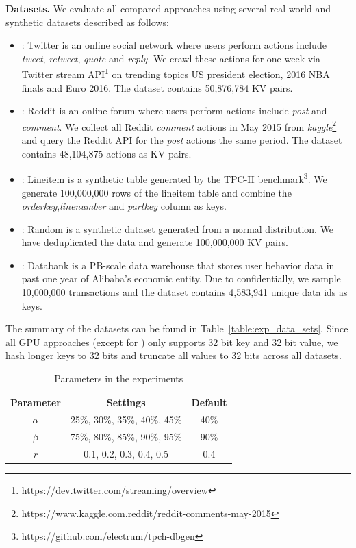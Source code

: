 \vspace{1mm}\noindent\textbf{Datasets.} We evaluate all compared approaches using several real world and synthetic datasets described as follows:
\begin{itemize}
	\item \dstwitter: Twitter is an online social network where users perform actions include \emph{tweet}, \emph{retweet}, \emph{quote} and \emph{reply}.
	We crawl these actions for one week via Twitter stream API\footnote{https://dev.twitter.com/streaming/overview} on trending topics US president election, 2016 NBA finals and Euro 2016. The dataset contains 50,876,784 KV pairs.
	\item \dsreddit: Reddit is an online forum where users perform actions include \emph{post} and \emph{comment}. We collect all Reddit \emph{comment} actions in May 2015 from \emph{kaggle}\footnote{https://www.kaggle.com.reddit/reddit-comments-may-2015} and query the Reddit API for the \emph{post} actions the same period. The dataset contains 48,104,875 actions as KV pairs. 
 	\item \dstpch: Lineitem is a synthetic table generated by the TPC-H benchmark\footnote{https://github.com/electrum/tpch-dbgen}. We generate  100,000,000 rows of the lineitem table and combine the \emph{orderkey},\emph{linenumber} and \emph{partkey} column as keys. 
	\item \dsrandom: Random is a synthetic dataset generated from a normal distribution. We have deduplicated the data and generate 100,000,000 KV pairs.  
	\item \dsali: Databank is a PB-scale data warehouse that stores user behavior data in past one year of Alibaba's economic entity. Due to confidentially, we sample 10,000,000 transactions and the dataset contains 4,583,941 unique data ids as keys.
\end{itemize}
The summary of the datasets can be found in Table~\ref{table:exp_data_sets}.
Since all GPU approaches (except for \voter) only supports 32 bit key and 32 bit value, we hash longer keys to 32 bits and truncate all values to 32 bits across all datasets. 


\begin{table}
	\centering
	\caption{Parameters in the experiments}
	\label{tbl:parameters}
	\begin{tabular}{|c|c|c|}
		\hline
		\textbf{Parameter} & \textbf{Settings} & \textbf{Default} \\ \hline
		$\alpha$ & 25\%, 30\%, 35\%, 40\%, 45\% & 40\% \\ \hline
		$\beta$  & 75\%, 80\%, 85\%, 90\%, 95\% & 90\% \\ \hline
		$r$ & 0.1, 0.2, 0.3, 0.4, 0.5 & 0.4 \\ \hline
	\end{tabular}
\end{table}



